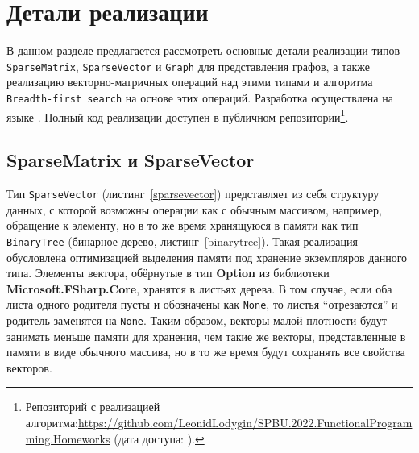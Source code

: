 
\section{Детали реализации}
В данном разделе предлагается рассмотреть основные детали реализации типов \texttt{SparseMatrix}, \texttt{SparseVector} и \texttt{Graph} для представления графов, а также реализацию векторно-матричных операций над этими типами и алгоритма \texttt{Breadth-first search} на основе этих операций. Разработка осуществлена на языке \fsharp. Полный код реализации доступен в публичном репозитории\footnote{Репозиторий с реализацией алгоритма:\url{https://github.com/LeonidLodygin/SPBU.2022.FunctionalProgramming.Homeworks} (дата доступа:   ).}.

\subsection{SparseMatrix и SparseVector}
Тип \texttt{SparseVector} (листинг~\ref{sparsevector}) представляет из себя структуру данных, с которой возможны операции как с обычным массивом, например, обращение к элементу, но в то же время хранящуюся в памяти как тип \texttt{BinaryTree} (бинарное дерево, листинг~\ref{binarytree}). Такая реализация обусловлена оптимизацией выделения памяти под хранение экземпляров данного типа. Элементы вектора, обёрнутые в тип \textbf{Option} из библиотеки \textbf{Microsoft.FSharp.Core}, хранятся в листьях дерева. В том случае, если оба листа одного родителя пусты и обозначены как \texttt{None}, то листья \enquote{отрезаются} и родитель заменятся на \texttt{None}. Таким образом, векторы малой плотности будут занимать меньше памяти для хранения, чем такие же векторы, представленные в памяти в виде обычного массива, но в то же время будут сохранять все свойства векторов.


